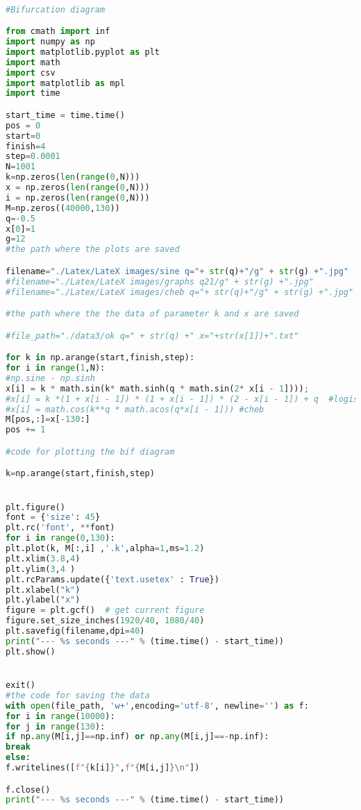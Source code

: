 

\begin{lstlisting}[language=Python]

#Bifurcation diagram

from cmath import inf
import numpy as np
import matplotlib.pyplot as plt
import math
import csv
import matplotlib as mpl
import time

start_time = time.time()
pos = 0
start=0
finish=4
step=0.0001
N=1001
k=np.zeros(len(range(0,N)))
x = np.zeros(len(range(0,N)))
i = np.zeros(len(range(0,N)))
M=np.zeros((40000,130))
q=-0.5
x[0]=1
g=12
#the path where the plots are saved

filename="./Latex/LateX images/sine q="+ str(q)+"/g" + str(g) +".jpg"
#filename="./Latex/LateX images/graphs q21/g" + str(g) +".jpg"
#filename="./Latex/LateX images/cheb q="+ str(q)+"/g" + str(g) +".jpg"

#the path where the the data of parameter k and x are saved

#file_path="./data3/ok q=" + str(q) +" x="+str(x[1])+".txt"

for k in np.arange(start,finish,step):
for i in range(1,N):
#np.sine - np.sinh
x[i] = k * math.sin(k* math.sinh(q * math.sin(2* x[i - 1]))); 
#x[i] = k *(1 + x[i - 1]) * (1 + x[i - 1]) * (2 - x[i - 1]) + q  #logistic
#x[i] = math.cos(k**q * math.acos(q*x[i - 1])) #cheb  
M[pos,:]=x[-130:]
pos += 1

#code for plotting the bif diagram

k=np.arange(start,finish,step)


plt.figure()
font = {'size': 45}
plt.rc('font', **font) 
for i in range(0,130):
plt.plot(k, M[:,i] ,'.k',alpha=1,ms=1.2)
plt.xlim(3.8,4)
plt.ylim(3,4 )
plt.rcParams.update({'text.usetex' : True})
plt.xlabel("k")
plt.ylabel("x")
figure = plt.gcf()  # get current figure
figure.set_size_inches(1920/40, 1080/40)
plt.savefig(filename,dpi=40)
print("--- %s seconds ---" % (time.time() - start_time))
plt.show()


exit()
#the code for saving the data
with open(file_path, 'w+',encoding='utf-8', newline='') as f:
for i in range(10000):
for j in range(130):
if np.any(M[i,j]==np.inf) or np.any(M[i,j]==-np.inf):
break
else:
f.writelines([f"{k[i]}",f"{M[i,j]}\n"])

f.close()
print("--- %s seconds ---" % (time.time() - start_time))




\end{lstlisting}


